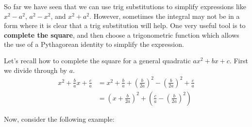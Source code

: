 \documentclass{ximera}
\begin{document}
So far we have seen that we can use trig substitutions to simplify expressions
like $x^{2}-a^{2}$, $a^{2}-x^{2}$, and $x^{2}+a^{2}$. 
However, sometimes the integral may not be in a form where it is clear that a trig substitution 
will help. 
One very useful tool is to \textbf{complete the square}, and then choose a
trigonometric function which allows the use of a Pythagorean identity
to simplify the expression. 

Let's recall how to complete the square for a general quadratic $ax^2+bx+c$.  First we divide through by $a$.
\begin{align*}
x^{2}+\frac{b}{a}x+\frac{c}{a} &=x^{2}+\frac{b}{a}+\left(\frac{b}{2a}\right)^{2}-\left(\frac{b}{2a}\right)^{2}+\frac{c}{a} \\
&=\left(x+\frac{b}{2a}\right)^{2}+\left(\frac{c}{a}-\left(\frac{b}{2a}\right)^{2}\right)
\end{align*}

Now, consider the following example:
\end{document}
